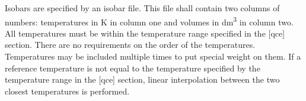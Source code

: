 \documentclass{scrartcl}
\begin{document}
Isobars are specified by an isobar file.
This file shall contain two columns of numbers: temperatures in \si{K} in column one and volumes in 
\si{\cubic\deci\meter} in column two.
All temperatures must be within the temperature range specified in the [qce] section.
There are no requirements on the order of the temperatures.
Temperatures may be included multiple times to put special weight on them.
If a reference temperature is not equal to the temperature specified by the temperature range in the 
[qce] section, linear interpolation between the two closest temperatures is performed.
\end{document}

